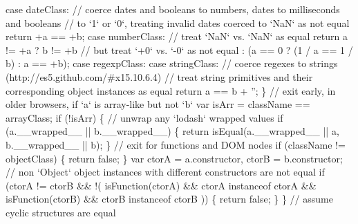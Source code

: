 \begin{DoxyCodeInclude}
{{\textcolor{stringliteral}{      case dateClass:}
\textcolor{stringliteral}{        // coerce dates and booleans to numbers, dates to milliseconds and booleans}
\textcolor{stringliteral}{        // to `1` or `0`, treating invalid dates coerced to `NaN` as not equal}
\textcolor{stringliteral}{        return +a == +b;}
\textcolor{stringliteral}{}
\textcolor{stringliteral}{      case numberClass:}
\textcolor{stringliteral}{        // treat `NaN` vs. `NaN` as equal}
\textcolor{stringliteral}{        return a != +a}
\textcolor{stringliteral}{          ? b != +b}
\textcolor{stringliteral}{          // but treat `+0` vs. `-0` as not equal}
\textcolor{stringliteral}{          : (a == 0 ? (1 / a == 1 / b) : a == +b);}
\textcolor{stringliteral}{}
\textcolor{stringliteral}{      case regexpClass:}
\textcolor{stringliteral}{      case stringClass:}
\textcolor{stringliteral}{        // coerce regexes to strings (http://es5.github.com/#x15.10.6.4)}
\textcolor{stringliteral}{        // treat string primitives and their corresponding object instances as equal}
\textcolor{stringliteral}{        return a == b + '';}
\textcolor{stringliteral}{    \}}
\textcolor{stringliteral}{    // exit early, in older browsers, if `a` is array-like but not `b`}
\textcolor{stringliteral}{    var isArr = className == arrayClass;}
\textcolor{stringliteral}{    }
\textcolor{stringliteral}{    if (!isArr) \{}
\textcolor{stringliteral}{      // unwrap any `lodash` wrapped values}
\textcolor{stringliteral}{      if (a.\_\_wrapped\_\_ || b.\_\_wrapped\_\_) \{}
\textcolor{stringliteral}{        return isEqual(a.\_\_wrapped\_\_ || a, b.\_\_wrapped\_\_ || b);}
\textcolor{stringliteral}{      \}}
\textcolor{stringliteral}{      // exit for functions and DOM nodes}
\textcolor{stringliteral}{      if (className != objectClass) \{}
\textcolor{stringliteral}{        return false;}
\textcolor{stringliteral}{      \}}
\textcolor{stringliteral}{      var ctorA = a.constructor,}
\textcolor{stringliteral}{          ctorB = b.constructor;}
\textcolor{stringliteral}{}
\textcolor{stringliteral}{      // non `Object` object instances with different constructors are not equal}
\textcolor{stringliteral}{      if (ctorA != ctorB && !(}
\textcolor{stringliteral}{            isFunction(ctorA) && ctorA instanceof ctorA &&}
\textcolor{stringliteral}{            isFunction(ctorB) && ctorB instanceof ctorB}
\textcolor{stringliteral}{          )) \{}
\textcolor{stringliteral}{        return false;}
\textcolor{stringliteral}{      \}}
\textcolor{stringliteral}{    \}}
\textcolor{stringliteral}{    // assume cyclic structures are equal}
}}
\end{DoxyCodeInclude}
